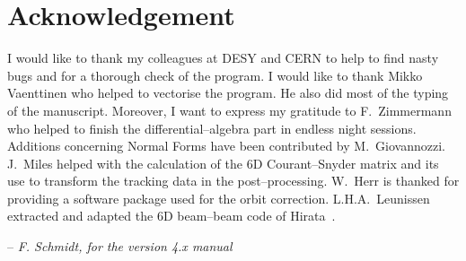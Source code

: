 \chapter*{Acknowledgement}

I would like to thank my colleagues at DESY and CERN to help to find nasty bugs and for a thorough check of the program.
I would like to thank Mikko Vaenttinen who helped to vectorise the program.
He also did most of the typing of the manuscript.
Moreover, I want to express my gratitude to F.~Zimmermann who helped to finish the differential--algebra part in endless night sessions.
Additions concerning Normal Forms have been contributed by M.~Giovannozzi.
J.~Miles helped with the calculation of the 6D Courant--Snyder matrix and its use to transform the tracking data in the post--processing.
W.~Herr is thanked for providing a software package used for the orbit correction. L.H.A.~Leunissen extracted and adapted the 6D beam--beam code of Hirata~\cite{Hirata}.

\bigskip
\hfill -- \textit{F. Schmidt, for the version 4.x manual}